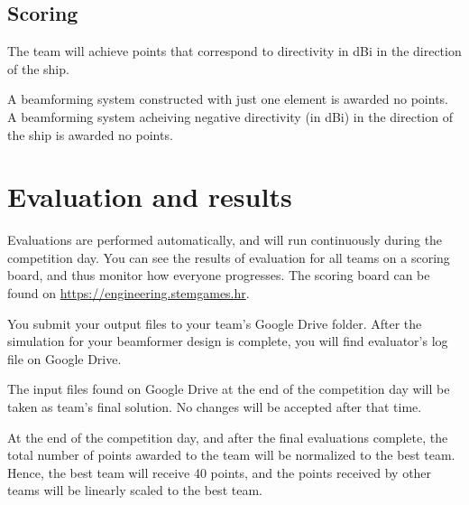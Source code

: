 \documentclass{article}[a4paper]
\begin{document}
\subsection*{Scoring}

The team will achieve points that correspond to directivity in dBi in the direction of the ship.

A beamforming system constructed with just one element is awarded no points. A beamforming system acheiving negative directivity (in dBi) in the direction of the ship is awarded no points.

\section*{Evaluation and results}

Evaluations are performed automatically, and will run continuously during the competition day. You can see the results of evaluation for all teams on a scoring board, and thus monitor how everyone progresses. The scoring board can be found on \url{https://engineering.stemgames.hr}.

You submit your output files to your team's Google Drive folder.
After the simulation for your beamformer design is complete, you will find evaluator's log file on Google Drive.

The input files found on Google Drive at the end of the competition day will be taken as team's final solution. No changes will be accepted after that time.

At the end of the competition day, and after the final evaluations complete, the total number of points awarded to the team will be normalized to the best team. Hence, the best team will receive 40 points, and the points received by other teams will be linearly scaled to the best team.
\end{document}
